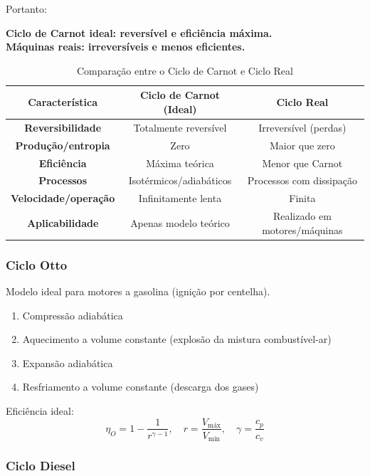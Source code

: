 Portanto:
\begin{center}

\textbf{Ciclo de Carnot ideal: reversível e eficiência máxima.}\\
\textbf{Máquinas reais: irreversíveis e menos eficientes.}
\end{center}

\begin{table}[h!]
\centering
\small
\caption{Comparação entre o Ciclo de Carnot e Ciclo Real}
\begin{tabular}{|c|c|c|}
\hline
\textbf{Característica} & \textbf{Ciclo de Carnot (Ideal)} & \textbf{Ciclo Real} \\ \hline
\textbf{Reversibilidade} 
& Totalmente reversível & Irreversível (perdas) \\ \hline
\textbf{Produção/entropia} 
& Zero & Maior que zero \\ \hline
\textbf{Eficiência} 
& Máxima teórica & Menor que Carnot \\ \hline
\textbf{Processos} 
& Isotérmicos/adiabáticos & Processos com dissipação\\ \hline
\textbf{Velocidade/operação} 
& Infinitamente lenta & Finita \\ \hline
\textbf{Aplicabilidade} 
& Apenas modelo teórico & Realizado em motores/máquinas \\ \hline
\end{tabular}
\end{table}


\subsubsection*{Ciclo Otto}

Modelo ideal para motores a gasolina (ignição por centelha).

\begin{enumerate}
  \item Compressão adiabática
  \item Aquecimento a volume constante (explosão da mistura combustível-ar)
  \item Expansão adiabática
  \item Resfriamento a volume constante (descarga dos gases)
\end{enumerate}

Eficiência ideal:
\[
\eta_O = 1 - \frac{1}{r^{\gamma-1}}, \quad r = \frac{V_{\text{máx}}}{V_{\text{mín}}}, \quad \gamma = \frac{c_p}{c_v}
\]

\subsubsection*{Ciclo Diesel}


